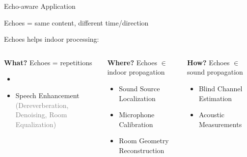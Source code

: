 \begin{frame}{Echo-aware Application}

    \begin{block}{Echoes = same content, different time/direction}
        \centering
    \end{block}


    Echoes helps indoor processing:
    \begin{columns}[T,onlytextwidth]
        \begin{block}{\textbf{What?}}
            \small
            Echoes = repetitions
            \begin{itemize}
                \item
                \item Speech Enhancement
                \\\textcolor{gray}{\small(Dereverberation, Denoising, Room Equalization)}
            \end{itemize}
        \end{block}

        \begin{block}{\textbf{Where?}}
            \small
            Echoes $\in$ indoor propagation
            \begin{itemize}
                \item Sound Source Localization
                \item Microphone Calibration
                \item Room Geometry Reconstruction
            \end{itemize}
        \end{block}

        \begin{block}{\textbf{How?}}
            \small
            Echoes $\in$ sound propagation
            \begin{itemize}
                \item Blind Channel Estimation
                \item Acoustic Measurements
            \end{itemize}
        \end{block}
    \end{columns}
\end{frame}

